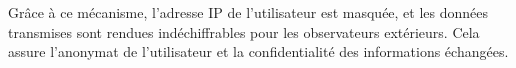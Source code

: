 Grâce à ce mécanisme, l'adresse IP de l'utilisateur est masquée, et les données transmises sont rendues indéchiffrables pour les observateurs extérieurs.
Cela assure l'anonymat de l'utilisateur et la confidentialité des informations échangées.









